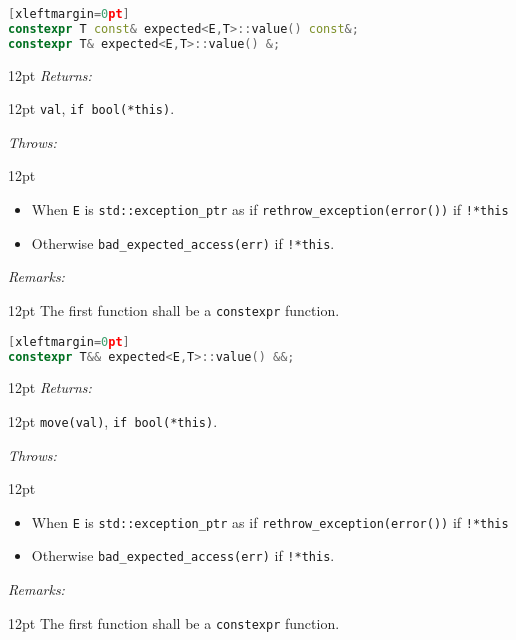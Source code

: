 \documentclass[a4paper,10pt]{article}
\newcommand{\cpp}[1]{\lstinline{#1}}
\newcommand{\wordingItem}[1]{\noindent\textit{#1:}}
\newenvironment{wordingTextItem}[1]{\wordingItem{#1}\vspace{2pt}\noindent\begin{adjustwidth}{12pt}{}}{\vspace{2pt}\end{adjustwidth}}
\newenvironment{wordingPara}{\begin{adjustwidth}{12pt}{}}{\end{adjustwidth}}
\begin{document}
\begin{lstlisting}[language=C++][xleftmargin=0pt]
constexpr T const& expected<E,T>::value() const&;
constexpr T& expected<E,T>::value() &;
\end{lstlisting}
\begin{wordingPara}
\begin{wordingTextItem}{Returns}
\cpp{val}, \cpp{if bool(*this)}.
\end{wordingTextItem}
\begin{wordingTextItem}{Throws}
\begin{itemize}
\item When \cpp{E} is \cpp{std::exception_ptr} as if \cpp{rethrow_exception(error())} if \cpp{!*this} 
\item Otherwise \cpp{bad_expected_access(err)} if \cpp{!*this}.
\end{itemize}

\end{wordingTextItem}
\begin{wordingTextItem}{Remarks}
The first function shall be a \cpp{constexpr} function.
\end{wordingTextItem}
\end{wordingPara}

\begin{lstlisting}[language=C++][xleftmargin=0pt]
constexpr T&& expected<E,T>::value() &&;
\end{lstlisting}
\begin{wordingPara}
\begin{wordingTextItem}{Returns}
\cpp{move(val)}, \cpp{if bool(*this)}.
\end{wordingTextItem}
\begin{wordingTextItem}{Throws}
\begin{itemize}
\item When \cpp{E} is \cpp{std::exception_ptr} as if \cpp{rethrow_exception(error())} if \cpp{!*this} 
\item Otherwise \cpp{bad_expected_access(err)} if \cpp{!*this}.
\end{itemize}
\end{wordingTextItem}
\begin{wordingTextItem}{Remarks}
The first function shall be a \cpp{constexpr} function.
\end{wordingTextItem}
\end{wordingPara}
\end{document}
